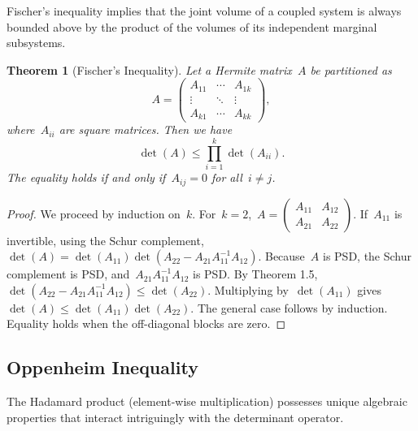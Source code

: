 \documentclass[12pt]{article}
\newtheorem{theorem}{Theorem}[section]
\begin{document}
\noindent Fischer's inequality implies that the joint volume of a coupled system is always bounded above by the product of the volumes of its independent marginal subsystems.
\begin{theorem}[Fischer's Inequality]
Let a Hermite matrix~$A$ be partitioned as
\[ A = \begin{pmatrix} A_{11} & \cdots & A_{1k} \\ \vdots & \ddots & \vdots \\ A_{k1} & \cdots & A_{kk} \end{pmatrix}, \]
where~$A_{ii}$ are square matrices. Then we have
\[ \det(A) \le \prod_{i=1}^k \det(A_{ii}). \]
The equality holds if and only if~$A_{ij} = 0$ for all~$i \neq j$.
\end{theorem}
\begin{proof}
We proceed by induction on~$k$. For~$k=2$,~$A = \begin{pmatrix} A_{11} & A_{12} \\ A_{21} & A_{22} \end{pmatrix}$. If~$A_{11}$ is invertible, using the Schur complement,~$\det(A) = \det(A_{11})\det(A_{22} - A_{21}A_{11}^{-1}A_{12})$. Because~$A$ is PSD, the Schur complement is PSD, and~$A_{21}A_{11}^{-1}A_{12}$ is PSD. By Theorem 1.5,~$\det(A_{22} - A_{21}A_{11}^{-1}A_{12}) \le \det(A_{22})$. Multiplying by~$\det(A_{11})$ gives~$\det(A) \le \det(A_{11})\det(A_{22})$. The general case follows by induction. Equality holds when the off-diagonal blocks are zero.
\end{proof}

\subsection{Oppenheim Inequality}
The Hadamard product (element-wise multiplication) possesses unique algebraic properties that interact intriguingly with the determinant operator.
\end{document}
